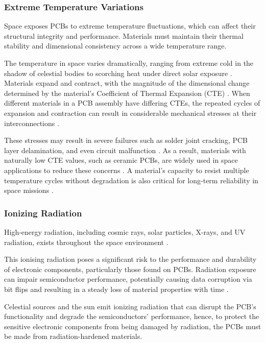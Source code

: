 \subsubsection{Extreme Temperature Variations}
Space exposes PCBs to extreme temperature fluctuations, which can affect 
their structural integrity and performance. Materials must maintain their 
thermal stability and dimensional consistency across a wide temperature range.

The temperature in space varies dramatically, ranging from extreme cold in 
the shadow of celestial bodies to scorching heat under direct solar exposure 
\cite{Proto-Electronics2024}. Materials expand and contract, with the magnitude 
of the dimensional change determined by the material's Coefficient of Thermal 
Expansion (CTE) \cite{911EDA2024}. When different materials in a PCB assembly 
have differing CTEs, the repeated cycles of expansion and contraction can result 
in considerable mechanical stresses at their interconnections \cite{Proto-Electronics2024}.

These stresses may result in severe failures such as solder joint cracking, 
PCB layer delamination, and even circuit malfunction \cite{Proto-Electronics2024}. 
As a result, materials with naturally low CTE values, such as ceramic PCBs, are 
widely used in space applications to reduce these concerns \cite{Proto-Electronics2024}. 
A material's capacity to resist multiple temperature cycles without degradation is 
also critical for long-term reliability in space missions \cite{resources.pcb.cadence}.


\subsubsection{Ionizing Radiation}
High-energy radiation, including cosmic rays, solar particles, X-rays, and 
UV radiation, exists throughout the space environment \cite{Proto-Electronics2024}.

This ionising radiation poses a significant risk to the performance and durability 
of electronic components, particularly those found on PCBs. Radiation exposure can 
impair semiconductor performance, potentially causing data corruption via bit flips 
and resulting in a steady loss of material properties with time \cite{Gatema2024}.

Celestial sources and the sun emit ionizing radiation that can disrupt the PCB's 
functionality and degrade the semiconductors' performance, hence, to protect the 
sensitive electronic components from being damaged by radiation, the PCBs must be 
made from radiation-hardened materials.

